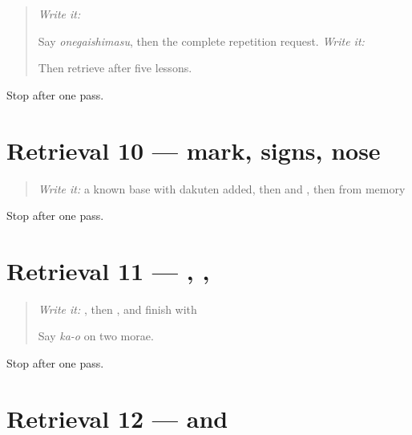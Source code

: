 \label{lesson:JA-R12-repair-04}



\begin{quote}
\emph{Write it:} \textbf{}

Say \emph{onegaishimasu}, then the complete repetition request. \emph{Write it:} \textbf{}

Then retrieve \textbf{} after five lessons.
\end{quote}

\begin{tcolorbox}[breakable,colback=teal!4,colframe=teal!35!black,title={Before you move on}]
Stop after one pass.
\end{tcolorbox}
\section[Practice]{Retrieval 10 — mark, signs, nose}

\label{lesson:JA-R12-writing-01}



\begin{quote}
\emph{Write it:} a known base with dakuten added, then \textbf{} and \textbf{}, then \textbf{} from memory
\end{quote}

\begin{tcolorbox}[breakable,colback=teal!4,colframe=teal!35!black,title={Before you move on}]
Stop after one pass.
\end{tcolorbox}
\section[Practice]{Retrieval 11 — , , }

\label{lesson:JA-R12-writing-02}



\begin{quote}
\emph{Write it:} \textbf{}, then \textbf{}, and finish with \textbf{}

Say \emph{ka-o} on two morae.
\end{quote}

\begin{tcolorbox}[breakable,colback=teal!4,colframe=teal!35!black,title={Before you move on}]
Stop after one pass.
\end{tcolorbox}
\section[Practice]{Retrieval 12 —  and }

